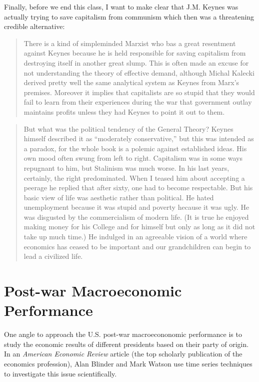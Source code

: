 \documentclass[]{book}
\begin{document}
Finally, before we end this class, I want to make clear that J.M. Keynes
was actually trying to save capitalism from communism which then was a
threatening credible alternative:

\begin{quote}
There is a kind of simpleminded Marxist who bas a great resentment
against Keynes because he is held responsible for saving capitalism from
destroying itself in another great slump. This is often made an excuse
for not understanding the theory of effective demand, although Michal
Kalecki derived pretty well the same analytical system as Keynes from
Marx's premises. Moreover it implies that capitalists are so stupid that
they would fail to learn from their experiences during the war that
government outlay maintains profits unless they had Keynes to point it
out to them.
\end{quote}

\begin{quote}
But what was the political tendency of the General Theory? Keynes
himself described it as ``moderately conservative,'' but this was
intended as a paradox, for the whole book is a polemic against
established ideas. His own mood often swung from left to right.
Capitalism was in some ways repugnant to him, but Stalinism was much
worse. In his last years, certainly, the right predominated. When I
teased him about accepting a peerage he replied that after sixty, one
had to become respectable. But his basic view of life was aesthetic
rather than political. He hated unemployment because it was stupid and
poverty hecause it was ugly. He was disgusted by the commercialism of
modern life. (It is true he enjoyed making money for his College and for
himself but only as long as it did not take up much time.) He indulged
in an agreeable vision of a world where economics has ceased to be
important and our grandchildren can begin to lead a civilized life.
\end{quote}

\section{Post-war Macroeconomic
Performance}\label{conclusion-macroeconomic-performance}

One angle to approach the U.S. post-war macroecononomic performance is
to study the economic results of different presidents based on their
party of origin. In an \emph{American Economic Review} article (the top
scholarly publication of the economics profession), Alan Blinder and
Mark Watson use time series techniques to investigate this issue
scientifically.
\end{document}
